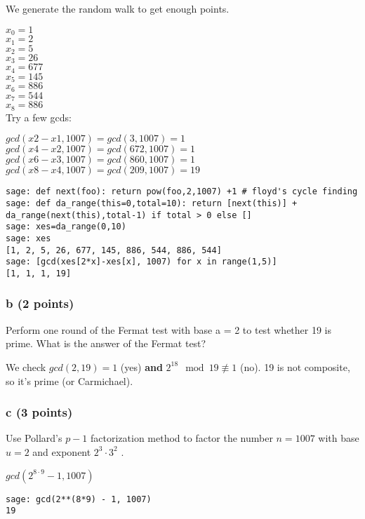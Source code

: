 \documentclass{article}
\begin{document}
We generate the random walk to get enough points.

$x_0 = 1$ \\
$x_1 = 2$ \\
$x_2 = 5$ \\
$x_3 = 26$ \\
$x_4 = 677$ \\
$x_5 = 145$ \\
$x_6 = 886$ \\
$x_7 = 544$ \\
$x_8 = 886$ \\

Try a few gcds:

$gcd(x2-x1, 1007) = gcd(3,   1007) = 1$ \\
$gcd(x4-x2, 1007) = gcd(672, 1007) = 1$ \\
$gcd(x6-x3, 1007) = gcd(860, 1007) = 1$ \\
$gcd(x8-x4, 1007) = gcd(209, 1007) = 19$

\small{
\begin{verbatim}
sage: def next(foo): return pow(foo,2,1007) +1 # floyd's cycle finding
sage: def da_range(this=0,total=10): return [next(this)] + da_range(next(this),total-1) if total > 0 else []
sage: xes=da_range(0,10)
sage: xes
[1, 2, 5, 26, 677, 145, 886, 544, 886, 544]
sage: [gcd(xes[2*x]-xes[x], 1007) for x in range(1,5)]
[1, 1, 1, 19]
\end{verbatim}
}

\subsubsection{b (2 points)}
Perform one round of the Fermat test with base
a = 2 to test whether 19 is prime.
What is the answer of the Fermat test?

We check $gcd(2,19) = 1$ (yes) \textbf{and} $2^{18} \mod 19 \not \equiv 1$ (no).
19 is not composite, so it's prime (or Carmichael).

\subsubsection{c (3 points)}
Use Pollard’s $p - 1$ factorization method to factor the number
$n = 1007$ with base $u = 2$ and exponent $2^3 \cdot 3^2$ .

$gcd(2^{8 \cdot 9} -1, 1007)$ \\
\begin{verbatim}
sage: gcd(2**(8*9) - 1, 1007)
19
\end{verbatim}
\end{document}

